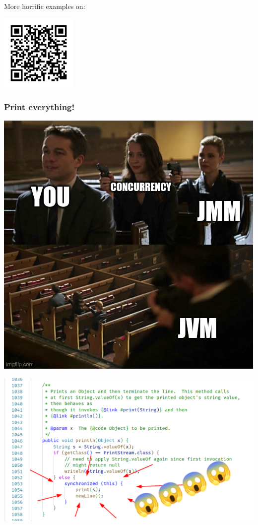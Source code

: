 \documentclass[aspectratio=1610, xcolor={dvipsnames}]{beamer}
\begin{document}
\begin{frame}
    More horrific examples on: 


    \begin{center}
        \includegraphics[height=10em]{fig/closeencounters.png}
    \end{center}

\end{frame}

\begin{frame}
    \frametitle{Print everything!}

    \pause
    \setlength{\columnsep}{-20ex}
    \begin{multicols}{2}
        \includegraphics[width=0.6\columnwidth]{fig/sniper.jpg}\pause

        \columnbreak

        \includegraphics[width=1.2\columnwidth]{fig/java_print.png}
    \end{multicols}

\end{frame}
\end{document}
